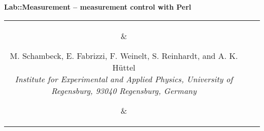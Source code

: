 \documentclass[portrait]{a0poster}
\begin{document}
\color{text}
\Large
%
\newlength{\seplength}
\newlength{\headerheight}
\newlength{\columnheight}
\newlength{\columnheighta}
\newlength{\columnheightb}
%
\setlength{\columnheight}{107cm}
\setlength{\columnheighta}{\columnheight-6cm}
\setlength{\columnheightb}{\columnheight+6.5cm}
\setlength{\columnwidth}{0.31\textwidth}
%
\setlength{\fboxsep}{10mm}
\setlength{\fboxrule}{0mm}
%
%
%
%
\hspace*{-1cm}\begin{minipage}[t][][t]{\textwidth-2\fboxsep-8\fboxrule}
\color{invheading}
\begin{center}
{
\VERYHuge \vspace*{-0.6cm}
\textsf{\textbf{
Lab::Measurement -- measurement control with Perl
}}
}
\\[\baselineskip]
\begin{tabular}{ccc}
\parbox{5cm}{\vspace*{-1cm}
\begin{center}
\end{center}
}
&
\parbox{70cm}{
\begin{center} 
{
\vspace*{-0.5cm}
\huge 
M. Schambeck, E. Fabrizzi, F. Weinelt,  S. Reinhardt, and A. K. Hüttel
}
\\[\medskipamount]
{\it 
\Large
Institute for Experimental and Applied
Physics, University of Regensburg, 93040 Regensburg, Germany\\
}
\end{center}
\vspace*{0.5cm}
}
&
\parbox{5cm}{\vspace*{-1cm}
\begin{center}
\end{center}
}
\end{tabular}
\end{center}
\end{minipage}
\vspace*{9mm}
\end{document}
